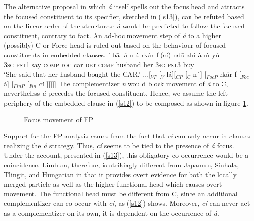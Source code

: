 \documentclass[output=paper,
modfonts
]{langscibook}
\begin{document}
The alternative proposal in which {\em \'a} itself spells out the focus head and attracts the focused constituent to its specifier, sketched in (\ref{s13}), can be refuted based on the linear order of the structures: {\em \'a} would be predicted to follow the focused constituent, contrary to fact. An ad-hoc movement step of {\em \'a} to a higher (possibly) C or Force head is ruled out based on the behaviour of focused constituents in embedded clauses.
\ea
\ea \label{s12}
\gll \'i b\=a l\'a n \'a rk\'ar f (c\'i) {nd\=u} {zh\`i} \`a \`m y\'u \\  
     \textsc{3sg} \textsc{pst1} say \textsc{comp} \textsc{foc} car \textsc{det} \textsc{comp} {husband} her \textsc{3sg} \textsc{pst3} buy  \\ 
\glt `She said that her husband bought the CAR.'
\ex *...[$_{VP}$ [$_{V}$ l\'a][$_{CP}$ [$_{C}$ n\`\textepsilon] [$_{FocP}$ rk\'ar f [$_{Foc}$ \'a] [$_{FinP}$ [$_{Fin}$ c\'i ]]]]] \label{s13}
\z \z
\vspace{3mm}
\noindent The complementizer {\em n} would block movement of {\em \'a} to C, nevertheless {\em \'a} precedes the focused constituent. Hence, we assume the left periphery of the embedded clause in (\ref{s12}) to be composed as shown in figure \ref{fig:syntax:f1}.
\begin{figure}
\caption{Focus movement of FP}
\label{fig:syntax:f1}
\end{figure}
Support for the FP analysis comes from the fact that {\em c\'i} can only occur in clauses realizing the {\em \'a} strategy. Thus, {\em c\'i} seems to be tied to the presence of {\em \'a} focus. Under the account, presented in (\ref{s13}), this obligatory co-occurrence would be a coincidence. Limbum, therefore, is strikingly different from Japanese, Sinhala, Tlingit, and Hungarian in that it provides overt evidence for both the locally merged particle as well as the higher functional head which causes overt movement. The functional head must be different from C, since an additional complementizer can co-occur with {\em c\'i}, as (\ref{s12}) shows. Moreover, {\em c\'i} can never act as a complementizer on its own, it is dependent on the occurrence of {\em \'a}.
\end{document}
